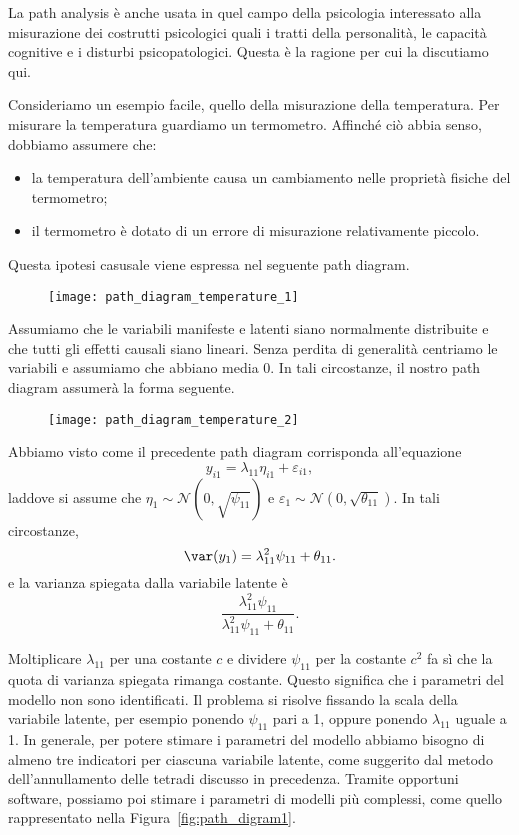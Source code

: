 La path analysis è anche usata in quel campo della psicologia interessato alla misurazione dei costrutti psicologici quali i tratti della personalità, le capacità cognitive e i disturbi psicopatologici.
Questa è la ragione per cui la discutiamo qui.

Consideriamo un esempio facile, quello della misurazione della temperatura.
Per misurare la temperatura guardiamo un termometro.
Affinché ciò abbia senso, dobbiamo assumere che:
\begin{itemize}
\item la temperatura dell'ambiente causa un cambiamento nelle proprietà fisiche del termometro;
\item il termometro è dotato di un errore di misurazione relativamente piccolo.
\end{itemize}
Questa ipotesi casusale viene espressa nel seguente path diagram.

\begin{figure}[h!]
\centering
\texttt{[image: path\_diagram\_temperature\_1]}
\end{figure}
Assumiamo che le variabili manifeste e latenti siano normalmente distribuite e che tutti gli effetti causali siano lineari.
Senza perdita di generalità centriamo le variabili e assumiamo che abbiano media 0.
In tali circostanze, il nostro path diagram assumerà la forma seguente.

\begin{figure}[h!]
\centering
\texttt{[image: path\_diagram\_temperature\_2]}
\end{figure}
Abbiamo visto come il precedente path diagram corrisponda all'equazione
\[
y_{i1} = \lambda_{11} \eta_{i1} + \varepsilon_{i1},
\]
laddove si assume che $\eta_1 \sim \mathcal{N}(0, \sqrt{\psi_{11}})$ e $\varepsilon_{1} \sim \mathcal{N}(0, \sqrt{\theta_{11}})$.
In tali circostanze, 
\[
\var(y_1) = \lambda^2_{11} \psi_{11} + \theta_{11}.
\]
e la varianza spiegata dalla variabile latente è
\[
\frac{\lambda^2_{11} \psi_{11}}{\lambda^2_{11} \psi_{11} + \theta_{11}}.
\]

Moltiplicare $\lambda_{11}$ per una costante $c$ e dividere $\psi_{11}$ per la costante $c^2$ fa sì che la quota di varianza spiegata rimanga costante.
Questo significa che i parametri del modello non sono identificati.
Il problema si risolve fissando la scala della variabile latente, per esempio ponendo $\psi_{11}$ pari a 1, oppure ponendo $\lambda_{11}$ uguale a 1.
In generale, per potere stimare i parametri del modello abbiamo bisogno di almeno tre indicatori per ciascuna variabile latente, come suggerito dal metodo dell'annullamento delle tetradi discusso in precedenza.
Tramite opportuni software, possiamo poi stimare i parametri di modelli più complessi, come quello rappresentato nella Figura~\ref{fig:path_digram1}.
 



